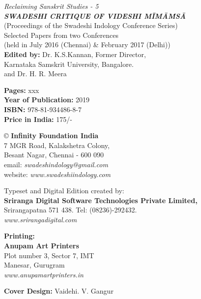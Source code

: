 \thispagestyle{empty}

 \textit{Reclaiming Sanskrit Studies - 5}\\\textbf{\textit{SWADESHI CRITIQUE OF VIDESHI MĪMĀṀSĀ}}\\
 (Proceedings of the Swadeshi Indology Conference Series)\\
 Selected Papers from two Conferences\\
 (held in July 2016 (Chennai) \& February 2017 (Delhi))\\\textbf{Edited by:} Dr. K.S.Kannan, Former Director,\\
 Karnataka Samskrit University, Bangalore.\\
 and Dr. H. R. Meera

 \textbf{Pages:} xxx\\\textbf{Year of Publication:} 2019\\\textbf{ISBN:} 978-81-934486-8-7\\\textbf{Price in India:} 175/-

 © \textbf{Infinity Foundation India}\\
 7 MGR Road, Kalakshetra Colony,\\
 Besant Nagar, Chennai - 600 090\\
 email: \textit{swadeshindology@gmail.com}\\
 website: \textit{www.swadeshiindology.com}

 Typeset and Digital Edition created by:\\\textbf{Sriranga Digital Software Technologies Private Limited,}\\
 Srirangapatna 571 438. Tel: (08236)-292432.\\\textit{www.srirangadigital.com}

 \textbf{Printing:}\\\textbf{Anupam Art Printers}\\
 Plot number 3, Sector 7, IMT\\
 Manesar, Gurugram\\\textit{www.anupamartprinters.in}

\textbf{Cover Design:} Vaidehi. V. Gangur

